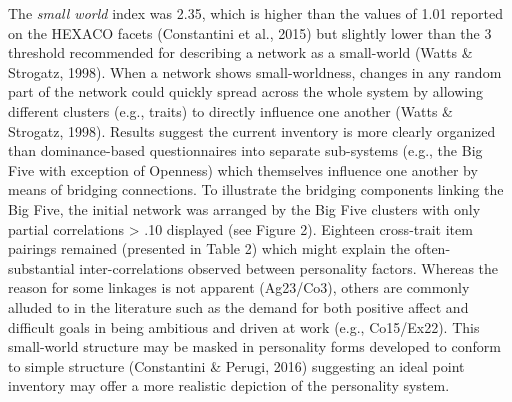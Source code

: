 \documentclass[english,man]{apa6}
\theoremstyle{definition}
\theoremstyle{definition}
\theoremstyle{remark}
\begin{document}
The \emph{small world} index was 2.35, which is higher than the values
of 1.01 reported on the HEXACO facets (Constantini et al., 2015) but
slightly lower than the 3 threshold recommended for describing a network
as a small-world (Watts \& Strogatz, 1998). When a network shows
small-worldness, changes in any random part of the network could quickly
spread across the whole system by allowing different clusters (e.g.,
traits) to directly influence one another (Watts \& Strogatz, 1998).
Results suggest the current inventory is more clearly organized than
dominance-based questionnaires into separate sub-systems (e.g., the Big
Five with exception of Openness) which themselves influence one another
by means of bridging connections. To illustrate the bridging components
linking the Big Five, the initial network was arranged by the Big Five
clusters with only partial correlations \textgreater{} .10 displayed
(see Figure 2). Eighteen cross-trait item pairings remained (presented
in Table 2) which might explain the often-substantial inter-correlations
observed between personality factors. Whereas the reason for some
linkages is not apparent (Ag23/Co3), others are commonly alluded to in
the literature such as the demand for both positive affect and difficult
goals in being ambitious and driven at work (e.g., Co15/Ex22). This
small-world structure may be masked in personality forms developed to
conform to simple structure (Constantini \& Perugi, 2016) suggesting an
ideal point inventory may offer a more realistic depiction of the
personality system.
\end{document}
